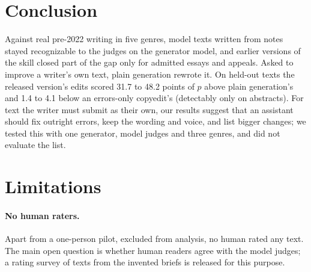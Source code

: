 \documentclass[11pt]{article}
\begin{document}
\section{Conclusion}

Against real pre-2022 writing in five genres, model texts written from notes stayed recognizable to the judges on the generator model, and earlier versions of the skill closed part of the gap only for admitted essays and appeals. Asked to improve a writer's own text, plain generation rewrote it. On held-out texts the released version's edits scored 31.7 to 48.2 points of $p$ above plain generation's and 1.4 to 4.1 below an errors-only copyedit's (detectably only on abstracts). For text the writer must submit as their own, our results suggest that an assistant should fix outright errors, keep the wording and voice, and list bigger changes; we tested this with one generator, model judges and three genres, and did not evaluate the list.

\section*{Limitations}
\label{sec:limitations}

\paragraph{No human raters.} Apart from a one-person pilot, excluded from analysis, no human rated any text. The main open question is whether human readers agree with the model judges; a rating survey of texts from the invented briefs is released for this purpose.
\end{document}
